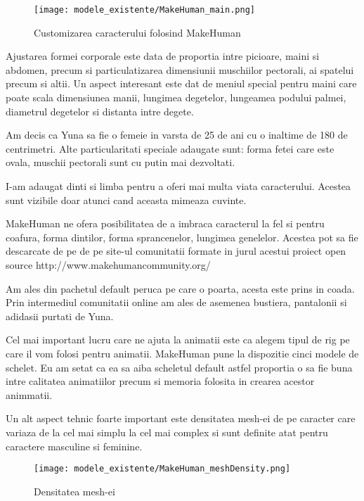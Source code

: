 \documentclass[12pt,a4paper]{report}
\begin{document}
\begin{figure}[th]
\centering
\texttt{[image: modele\_existente/MakeHuman\_main.png]}
  \caption[Customizarea caracterului folosind MakeHuman]{Customizarea caracterului folosind MakeHuman\protect\footnotemark}
  \label{figure_1:picture_11}
\end{figure}

Ajustarea formei corporale este data de proportia intre picioare, maini si abdomen, precum si particulatizarea dimensiunii muschiilor pectorali, ai spatelui precum si altii. Un aspect interesant este dat de meniul special pentru maini care poate scala dimensiunea manii, lungimea degetelor, lungeamea podului palmei, diametrul degetelor si distanta intre degete.

Am decis ca Yuna sa fie o femeie in varsta de 25 de ani cu o inaltime de 180 de centrimetri. Alte particularitati speciale adaugate sunt: forma fetei care este ovala, muschii pectorali sunt cu putin mai dezvoltati.

I-am adaugat dinti si limba pentru a oferi mai multa viata caracterului. Acestea sunt vizibile doar atunci cand aceasta mimeaza cuvinte.

MakeHuman ne ofera posibilitatea de a imbraca caracterul la fel si pentru coafura, forma dintilor, forma sprancenelor, lungimea genelelor. Acestea pot sa fie descarcate de pe de pe site-ul comunitatii formate in jurul acestui proiect open source http://www.makehumancommunity.org/

Am ales din pachetul default peruca pe care o poarta, acesta este prins in coada. Prin intermediul comunitatii online am ales de asemenea bustiera, pantalonii si adidasii purtati de Yuna.

Cel mai important lucru care ne ajuta la animatii este ca alegem tipul de rig pe care il vom folosi pentru animatii. MakeHuman pune la dispozitie cinci modele de schelet. Eu am setat ca ea sa aiba scheletul default astfel proportia o sa fie buna intre calitatea animatiilor precum si memoria folosita in crearea acestor animmatii.

Un alt aspect tehnic foarte important este densitatea mesh-ei de pe caracter care variaza de la cel mai simplu la cel mai complex si sunt definite atat pentru caractere masculine si feminine.

\begin{figure}[th]
\centering
\texttt{[image: modele\_existente/MakeHuman\_meshDensity.png]}
  \caption[Densitatea mesh-ei]{Densitatea mesh-ei\protect\footnotemark}
  \label{figure_1:picture_12}
\end{figure}
\end{document}
